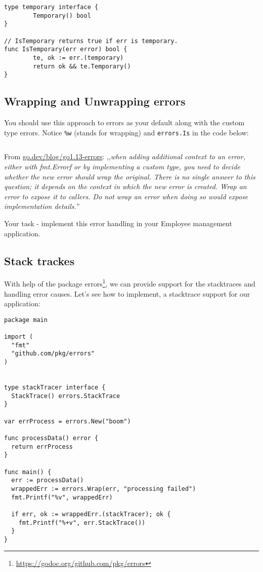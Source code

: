 \documentclass[11pt, letterpaper]{article}
\begin{document}
\begin{verbatim}
type temporary interface {
        Temporary() bool
}
 
// IsTemporary returns true if err is temporary.
func IsTemporary(err error) bool {
        te, ok := err.(temporary)
        return ok && te.Temporary()
}
\end{verbatim}

\pagebreak

\subsection{Wrapping and Unwrapping errors}

You should use this approach to errors as your default along with the custom type errors. Notice \verb|%w| (stands for wrapping) and \texttt{errors.Is}  in the code below:

\inputminted[frame=single]{go}{examples/wrap_errors/main.go}

From \href{https://go.dev/blog/go1.13-errors}{go.dev/blog/go1.13-errors}: ,,\emph{when adding additional context to an error, either with fmt.Errorf or by implementing a custom type, you need to decide whether the new error should wrap the original. There is no single answer to this question; it depends on the context in which the new error is created. Wrap an error to expose it to callers. Do not wrap an error when doing so would expose implementation details.''}

\bigskip

Your task -  implement this error handling in your Employee management application.

\subsection{Stack trackes}

With help of the package errors\footnote{\href{https://godoc.org/github.com/pkg/errors}{https://godoc.org/github.com/pkg/errors}}, we can provide support for the stacktraces and handling error causes. Let's see how to implement, a stacktrace support for our application: 

\begin{verbatim}
package main

import (
  "fmt"
  "github.com/pkg/errors"
)


type stackTracer interface {
  StackTrace() errors.StackTrace
}

var errProcess = errors.New("boom")

func processData() error {
  return errProcess
}

func main() {
  err := processData()
  wrappedErr := errors.Wrap(err, "processing failed")
  fmt.Printf("%v", wrappedErr)

  if err, ok := wrappedErr.(stackTracer); ok {
    fmt.Printf("%+v", err.StackTrace())
  }
}
\end{verbatim}
\end{document}
